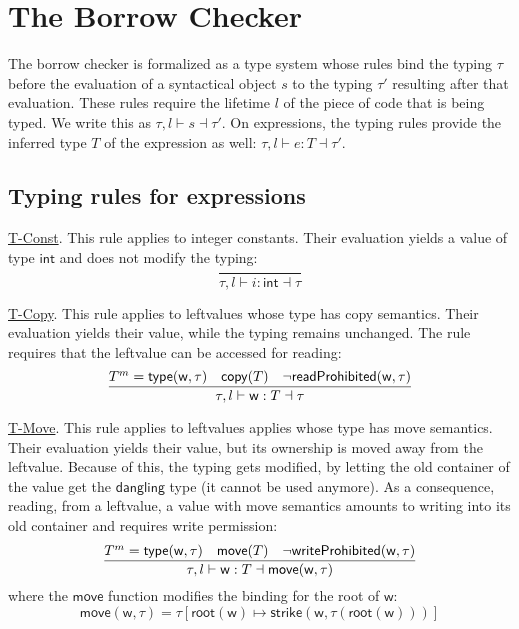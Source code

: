 \section{The Borrow Checker}\label{sec:borrow_checker}

The borrow checker is formalized as a type system whose rules
bind the typing $\tau$ before the evaluation of a syntactical object $s$ to
the typing $\tau'$ resulting after that evaluation.
These rules require the lifetime $l$ of the piece of code that is being typed.
We write this as $\tau,l\vdash s\dashv\tau'$.
On expressions, the typing
rules provide the inferred type $T$ of the expression as well:
$\tau,l\vdash e:T\dashv\tau'$.

\subsection{Typing rules for expressions}

\underline{\textsf{T-Const}}.
This rule applies to integer constants. Their evaluation
yields a value of type $\mathsf{int}$ and does not modify the typing:
\[
\frac
    {}
    {\tau,l\vdash i:\mathsf{int}\dashv\tau}
\]

\noindent
\underline{\textsf{T-Copy}}.
This rule applies to leftvalues whose type
has copy semantics. Their evaluation yields their value, while
the typing remains unchanged. The rule requires that the leftvalue
can be accessed for reading:
\[
\frac
    {T^m=\mathsf{type}(\mathsf{w},\tau)\quad\mathsf{copy}(T)\quad\neg\mathsf{readProhibited}(\mathsf{w},\tau)}
    {\tau,l\vdash\mathsf{w}:T\dashv\tau}
\]

\noindent
\underline{\textsf{T-Move}}.
This rule applies to leftvalues applies whose type
has move semantics. Their evaluation yields their value,
but its ownership is moved away from the leftvalue. Because of this,
the typing gets modified, by letting the old container of the value
get the $\mathsf{dangling}$ type (it cannot be used anymore).
As a consequence, reading, from a leftvalue, a value with move semantics
amounts to writing into its old container and requires write permission:
\[
\frac
    {T^m=\mathsf{type}(\mathsf{w},\tau)\quad\mathsf{move}(T)\quad\neg\mathsf{writeProhibited}(\mathsf{w},\tau)}
    {\tau,l\vdash\mathsf{w}:T\dashv\mathsf{move}(\mathsf{w},\tau)}
\]
where the $\mathsf{move}$ function
modifies the binding for the root of $\mathsf{w}$:
\[
\mathsf{move}(\mathsf{w},\tau)=\tau[\mathsf{root}(\mathsf{w})\mapsto
  \mathsf{strike}(\mathsf{w},\tau(\mathsf{root}(\mathsf{w})))]
\]

